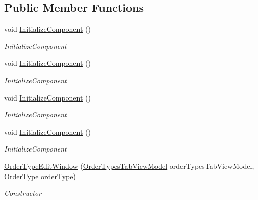 \subsection*{Public Member Functions}
\begin{DoxyCompactItemize}
\item 
void \hyperlink{class_baudi_1_1_client_1_1_view_1_1_edit_windows_1_1_order_type_edit_window_a80411b34b064111b6d1dee0d024907c7}{Initialize\+Component} ()
\begin{DoxyCompactList}\small\item\em Initialize\+Component \end{DoxyCompactList}\item 
void \hyperlink{class_baudi_1_1_client_1_1_view_1_1_edit_windows_1_1_order_type_edit_window_a80411b34b064111b6d1dee0d024907c7}{Initialize\+Component} ()
\begin{DoxyCompactList}\small\item\em Initialize\+Component \end{DoxyCompactList}\item 
void \hyperlink{class_baudi_1_1_client_1_1_view_1_1_edit_windows_1_1_order_type_edit_window_a80411b34b064111b6d1dee0d024907c7}{Initialize\+Component} ()
\begin{DoxyCompactList}\small\item\em Initialize\+Component \end{DoxyCompactList}\item 
void \hyperlink{class_baudi_1_1_client_1_1_view_1_1_edit_windows_1_1_order_type_edit_window_a80411b34b064111b6d1dee0d024907c7}{Initialize\+Component} ()
\begin{DoxyCompactList}\small\item\em Initialize\+Component \end{DoxyCompactList}\item 
\hyperlink{class_baudi_1_1_client_1_1_view_1_1_edit_windows_1_1_order_type_edit_window_ab4cb3ba3b8b093a2a4f363aa94896697}{Order\+Type\+Edit\+Window} (\hyperlink{class_baudi_1_1_client_1_1_view_models_1_1_tabs_view_models_1_1_order_types_tab_view_model}{Order\+Types\+Tab\+View\+Model} order\+Types\+Tab\+View\+Model, \hyperlink{class_baudi_1_1_d_a_l_1_1_models_1_1_order_type}{Order\+Type} order\+Type)
\begin{DoxyCompactList}\small\item\em Constructor \end{DoxyCompactList}\end{DoxyCompactItemize}


